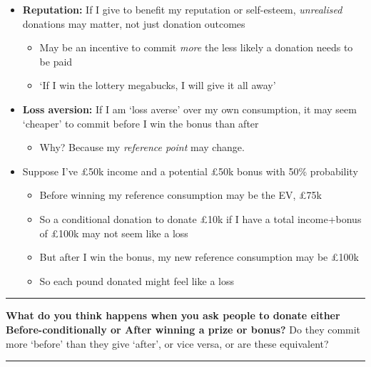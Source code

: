 \documentclass[]{article}
\providecommand{\tightlist}{%
  \setlength{\itemsep}{0pt}\setlength{\parskip}{0pt}}
\begin{document}
\begin{itemize}
\tightlist
\item
  \textbf{Reputation:} If I give to benefit my reputation or self-esteem, \emph{unrealised} donations may matter, not just donation outcomes

  \begin{itemize}
  \tightlist
  \item
    May be an incentive to commit \emph{more} the less likely a donation needs to be paid
  \item
    `If I win the lottery megabucks, I will give it all away'
  \end{itemize}
\item
  \textbf{Loss aversion:} If I am `loss averse' over my own consumption, it may seem `cheaper' to commit before I win the bonus than after

  \begin{itemize}
  \tightlist
  \item
    Why? Because my \emph{reference point} may change.
  \end{itemize}
\item
  Suppose I've \pounds50k income and a potential \pounds50k bonus with 50\% probability

  \begin{itemize}
  \tightlist
  \item
    Before winning my reference consumption may be the EV, \pounds75k
  \item
    So a conditional donation to donate \pounds10k if I have a total income+bonus of \pounds100k may not seem like a loss
  \item
    But after I win the bonus, my new reference consumption may be \pounds100k
  \item
    So each pound donated might feel like a loss
  \end{itemize}
\end{itemize}

\begin{center}\rule{0.5\linewidth}{\linethickness}\end{center}

\textbf{What do you think happens when you ask people to donate either Before-conditionally or After winning a prize or bonus?}
Do they commit more `before' than they give `after', or vice versa, or are these equivalent?

\begin{center}\rule{0.5\linewidth}{\linethickness}\end{center}
\end{document}

